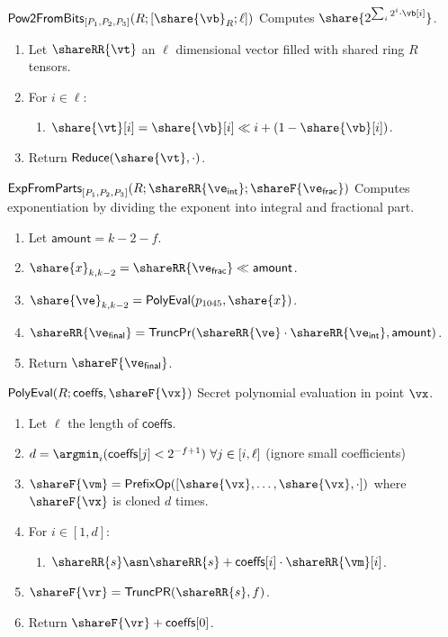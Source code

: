 \msubsubsection
  {$\mathsf{Pow2FromBits}_{[P_1, P_2, P_3]}(R; [\share{\vb}_R; \ell])$}
  Computes $\share{2^{\sum_i{2^i\cdot \vb[i]}}}$.
\begin{enumerate}
	\item Let $\shareRR{\vt}$ an $\ell$ dimensional vector filled with
	shared ring $R$ tensors.
	\item For $i \in \ell$:
	\begin{enumerate}
		\item $\share{\vt}[i] = \share{\vb}[i] \ll i + (1 - \share{\vb}[i])$.
	\end{enumerate}
	\item Return $\mathsf{Reduce}(\share{\vt}, \cdot)$.
\end{enumerate}

\msubsubsection
  {$\mathsf{ExpFromParts}_{[P_1, P_2, P_3]}(R; \shareRR{\ve_{\mathsf{int}}}; \shareF{\ve_{\mathsf{frac}}})$}
  Computes exponentiation by dividing the exponent into integral and fractional part.
\begin{enumerate}
	\item Let $\mathsf{amount} = k - 2 - f$.
	\item $\share{x}_{k, k - 2} = \shareRR{\ve_{\mathsf{frac}}} \ll \mathsf{amount}$.
	\item $\share{\ve}_{k, k-2} = \mathsf{PolyEval}(p_{1045}, \share{x})$.
	\item $\shareRR{\ve_{\mathsf{final}}} = \mathsf{TruncPr}(\shareRR{\ve} \cdot \shareRR{\ve_{\mathsf{int}}}, \mathsf{amount})$.
	\item Return $\shareF{\ve_{\mathsf{final}}}$.
\end{enumerate}

\msubsubsection
{$\mathsf{PolyEval}(R; \mathsf{coeffs}, \shareF{\vx})$}
Secret polynomial evaluation in point $\vx$.
\begin{enumerate}
	\item Let $\ell$ the length of $\mathsf{coeffs}$.
	\item $d = \argmin_i (\mathsf{coeffs}[j] < 2^{-f+1}) \text{ } \forall j \in [i, \ell]$ (ignore small coefficients)
	\item $\shareF{\vm} = \mathsf{PrefixOp}([\share{\vx}, \dots, \share{\vx}, \cdot])$ where $\shareF{\vx}$ is cloned $d$ times.
	\item For $i \in [1, d]$:
	\begin{enumerate}
		\item $\shareRR{s} \asn \shareRR{s} + \mathsf{coeffs}[i] \cdot \shareRR{\vm}[i]$.
	\end{enumerate}
	\item $\shareF{\vr} = \mathsf{TruncPR}(\shareRR{s}, f)$.
	\item Return $\shareF{\vr} + \mathsf{coeffs}[0]$.
\end{enumerate}



